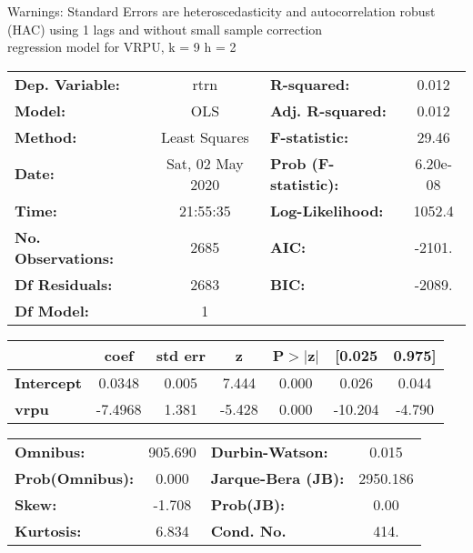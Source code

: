 Warnings: \newline
 [1] Standard Errors are heteroscedasticity and autocorrelation robust (HAC) using 1 lags and without small sample correction\\ 

regression model for VRPU, k = 9 h = 2\begin{center}
\begin{tabular}{lclc}
\toprule
\textbf{Dep. Variable:}    &       rtrn       & \textbf{  R-squared:         } &     0.012   \\
\textbf{Model:}            &       OLS        & \textbf{  Adj. R-squared:    } &     0.012   \\
\textbf{Method:}           &  Least Squares   & \textbf{  F-statistic:       } &     29.46   \\
\textbf{Date:}             & Sat, 02 May 2020 & \textbf{  Prob (F-statistic):} &  6.20e-08   \\
\textbf{Time:}             &     21:55:35     & \textbf{  Log-Likelihood:    } &    1052.4   \\
\textbf{No. Observations:} &        2685      & \textbf{  AIC:               } &    -2101.   \\
\textbf{Df Residuals:}     &        2683      & \textbf{  BIC:               } &    -2089.   \\
\textbf{Df Model:}         &           1      & \textbf{                     } &             \\
\bottomrule
\end{tabular}
\begin{tabular}{lcccccc}
                   & \textbf{coef} & \textbf{std err} & \textbf{z} & \textbf{P$> |$z$|$} & \textbf{[0.025} & \textbf{0.975]}  \\
\midrule
\textbf{Intercept} &       0.0348  &        0.005     &     7.444  &         0.000        &        0.026    &        0.044     \\
\textbf{vrpu}      &      -7.4968  &        1.381     &    -5.428  &         0.000        &      -10.204    &       -4.790     \\
\bottomrule
\end{tabular}
\begin{tabular}{lclc}
\textbf{Omnibus:}       & 905.690 & \textbf{  Durbin-Watson:     } &    0.015  \\
\textbf{Prob(Omnibus):} &   0.000 & \textbf{  Jarque-Bera (JB):  } & 2950.186  \\
\textbf{Skew:}          &  -1.708 & \textbf{  Prob(JB):          } &     0.00  \\
\textbf{Kurtosis:}      &   6.834 & \textbf{  Cond. No.          } &     414.  \\
\bottomrule
\end{tabular}
\end{center}

